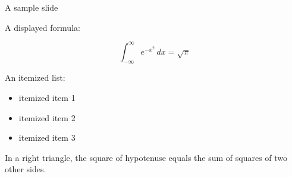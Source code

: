 \documentclass[handout]{beamer}
\begin{document}
\begin{frame}{A sample slide}

A displayed formula:

\[
  \int_{-\infty}^\infty e^{-x^2} \, dx = \sqrt{\pi}
\]

An itemized list:

\begin{itemize}
  \item itemized item 1
  \item itemized item 2
  \item itemized item 3
\end{itemize}

\begin{theorem}
  In a right triangle, the square of hypotenuse equals
  the sum of squares of two other sides.
\end{theorem}

\end{frame}
\end{document}
